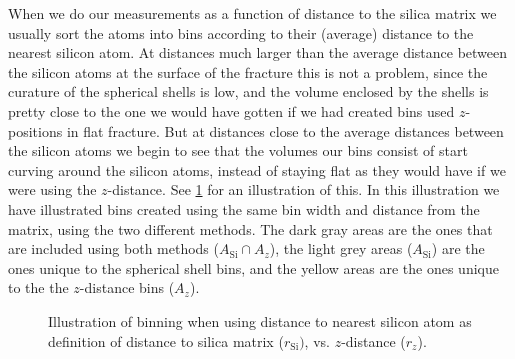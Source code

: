When we do our measurements as a function of distance to the silica matrix we usually sort the atoms into bins according to their (average) distance to the nearest silicon atom. At distances much larger than the average distance between the silicon atoms at the surface of the fracture this is not a problem, since the curature of the spherical shells is low, and the volume enclosed by the shells is pretty close to the one we would have gotten if we had created bins used $z$-positions in flat fracture. But at distances close to the average distances between the silicon atoms we begin to see that the volumes our bins consist of start curving around the silicon atoms, instead of staying flat as they would have if we were using the $z$-distance. See \cref{fig:distance_to_matrix_illustration} for an illustration of this. In this illustration we have illustrated bins created using the same bin width and distance from the matrix, using the two different methods. The dark gray areas are the ones that are included using both methods ($A_\text{Si}\cap A_z$), the light grey areas ($A_\text{Si}$) are the ones unique to the spherical shell bins, and the yellow areas are the ones unique to the the $z$-distance bins ($A_z$).%
%
\begin{figure}[htb]%
    \begin{minipage}[c]{0.6\textwidth}%
        \captionsetup{width=0.925\textwidth}%
        \centering%
        \caption{%
            Plot of the number of atoms in each bin, when using the distance to the nearest atom for binning.%
            \label{fig:distance_to_matrix_number_of_atoms}%
        }%
    \end{minipage}%
    \hfill%
    \begin{minipage}[c]{0.3999\textwidth}%
        \captionsetup{width=0.9\textwidth}%
        \centering%
        \caption{%
            Illustration of binning when using distance to nearest silicon atom as definition of distance to silica matrix ($r_\text{Si})$, vs. $z$-distance ($r_z$).%
            \label{fig:distance_to_matrix_illustration}%
        }%
    \end{minipage}%
\end{figure}%

